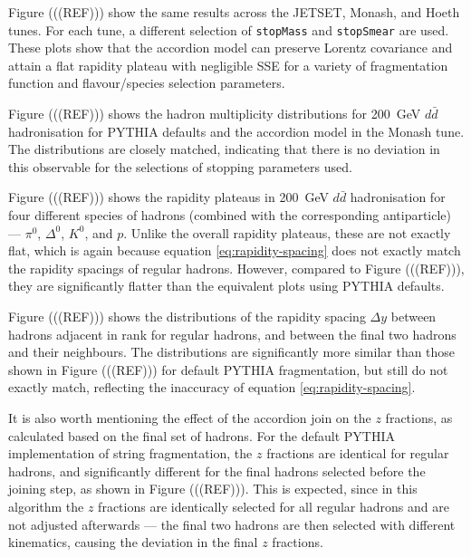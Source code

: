 \documentclass[12pt,a4paper]{report}
\begin{document}
Figure (((REF))) show the same results across the JETSET, Monash, and Hoeth tunes. For each tune, a different selection of \texttt{stopMass} and \texttt{stopSmear} are used. These plots show that the accordion model can preserve Lorentz covariance and attain a flat rapidity plateau with negligible SSE for a variety of fragmentation function and flavour/species selection parameters.

Figure (((REF))) shows the hadron multiplicity distributions for \qty{200}{\giga\electronvolt} $d\bar{d}$ hadronisation for PYTHIA defaults and the accordion model in the Monash tune. The distributions are closely matched, indicating that there is no deviation in this observable for the selections of stopping parameters used.

Figure (((REF))) shows the rapidity plateaus in \qty{200}{\giga\electronvolt} $d\bar{d}$ hadronisation for four different species of hadrons (combined with the corresponding antiparticle) --- $\pi^0$, $\Delta^0$, $K^0$, and $p$. Unlike the overall rapidity plateaus, these are not exactly flat, which is again because equation \eqref{eq:rapidity-spacing} does not exactly match the rapidity spacings of regular hadrons. However, compared to Figure (((REF))), they are significantly flatter than the equivalent plots using PYTHIA defaults.

Figure (((REF))) shows the distributions of the rapidity spacing $\Delta y$ between hadrons adjacent in rank for regular hadrons, and between the final two hadrons and their neighbours. The distributions are significantly more similar than those shown in Figure (((REF))) for default PYTHIA fragmentation, but still do not exactly match, reflecting the inaccuracy of equation \eqref{eq:rapidity-spacing}.

It is also worth mentioning the effect of the accordion join on the $z$ fractions, as calculated based on the final set of hadrons. For the default PYTHIA implementation of string fragmentation, the $z$ fractions are identical for regular hadrons, and significantly different for the final hadrons selected before the joining step, as shown in Figure (((REF))). This is expected, since in this algorithm the $z$ fractions are identically selected for all regular hadrons and are not adjusted afterwards --- the final two hadrons are then selected with different kinematics, causing the deviation in the final $z$ fractions.
\end{document}
